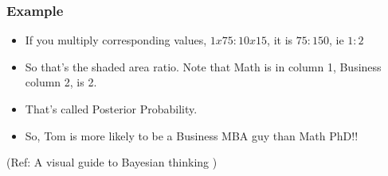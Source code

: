 









\begin{frame}[fragile]\frametitle{Example}

\begin{itemize}
\item If you multiply corresponding values, $1x 75 : 10 x 15$, it is $75: 150$, ie $1:2$
\item So that’s the shaded area ratio. Note that Math is in column 1, Business column 2, is 2. 
\item That’s called Posterior Probability.
\item So, Tom is more likely to be a Business MBA guy than Math PhD!!
\end{itemize}

{\tiny (Ref: A visual guide to Bayesian thinking )}
\end{frame}

